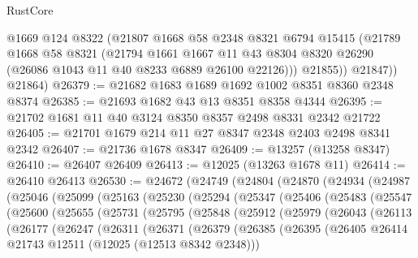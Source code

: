 \begin{lexlean}{RustCore}
\begin{coremodule}
            @1669
            @124
            @8322
            (@21807
              @1668
              @58
              @2348
              @8321
              @6794
              @15415
              (@21789
                @1668
                @58
                @8321
                (@21794
                  @1661
                  @1667
                  @11
                  @43
                  @8304
                  @8320
                  @26290
                  (@26086 @1043 @11 @40 @8233 @6889 @26100 @22126)))
              @21855))
          @21847))
      @21864)
@26379 := @21682 @1683 @1689 @1692 @1002 @8351 @8360 @2348 @8374
@26385 := @21693 @1682 @43 @13 @8351 @8358 @4344
@26395 := @21702 @1681 @11 @40 @3124 @8350 @8357 @2498 @8331 @2342 @21722
@26405 := @21701 @1679 @214 @11 @27 @8347 @2348 @2403 @2498 @8341 @2342
@26407 := @21736 @1678 @8347
@26409 := @13257 (@13258 @8347)
@26410 := @26407 @26409
@26413 := @12025 (@13263 @1678 @11)
@26414 := @26410 @26413
@26530 := @24672
    (@24749
      (@24804
        (@24870
          (@24934
            (@24987
              (@25046
                (@25099
                  (@25163
                    (@25230
                      (@25294
                        (@25347
                          (@25406
                            (@25483
                              (@25547
                                (@25600
                                  (@25655
                                    (@25731
                                      (@25795
                                        (@25848
                                          (@25912
                                            (@25979
                                              (@26043
                                                (@26113
                                                  (@26177
                                                    (@26247
                                                      (@26311
                                                        (@26371
                                                          (@26379
                                                            (@26385
                                                              (@26395
                                                                (@26405
                                                                  @26414
                                                                  @21743
                                                                  @12511
                                                                  (@12025 (@12513 @8342 @2348)))

\end{coremodule}
\end{lexlean}
